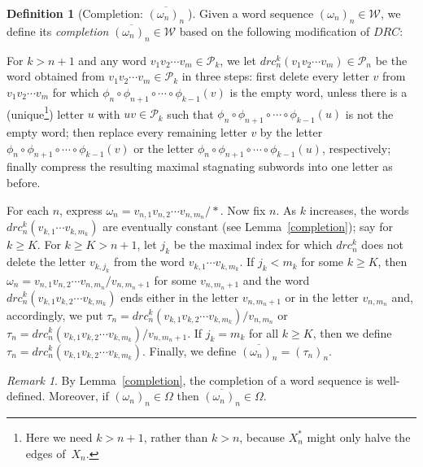 \documentclass{amsart}
\theoremstyle{definition}
\newtheorem{definition}[theorem]{Definition}
\theoremstyle{remark}
\newtheorem{remark}[theorem]{Remark}
\numberwithin{equation}{section}
\begin{document}
\begin{definition}[Completion: $\overline{(\omega_n)_n}\;$] \label{CompletionDef} Given a word sequence $(\omega_n)_n\in {\mathcal W}$, we define its {\em completion} $\overline{(\omega_n)_n}\in {\mathcal W}$ based on the following modification of  $DRC$:

For $k>n+1$ and any word $v_1v_2\cdots v_m\in {\mathcal P}_k$, we let
$drc^k_n(v_1v_2\cdots v_m)\in {\mathcal P}_n$ be the word obtained from $v_1v_2\cdots v_m\in {\mathcal P}_k$ in three steps: first delete every letter $v$ from $v_1v_2\cdots v_m$ for which  $\phi_n\circ \phi_{n+1}\circ\cdots\circ \phi_{k-1}(v)$ is the empty word, unless there is a (unique\footnote{Here we need $k>n+1$, rather than $k>n$, because $X^\ast_n$ might only halve the edges of~$X_n$.}) letter $u$ with $uv\in {\mathcal P}_k$ such that $\phi_n\circ \phi_{n+1}\circ\cdots\circ \phi_{k-1}(u)$ is not the empty word; then replace every remaining
letter $v$ by the letter
$\phi_n\circ \phi_{n+1}\circ\cdots\circ \phi_{k-1}(v)$ or the  letter $\phi_n\circ \phi_{n+1}\circ\cdots\circ \phi_{k-1}(u)$, respectively; finally compress the resulting maximal stagnating subwords into one letter as before.

For each $n$, express $\omega_n=v_{n,1}v_{n,2}\cdots v_{n,{m_n}}/\ast$. Now fix $n$. As $k$ increases, the words  $drc^k_n(v_{k,1}\cdots v_{k,{m_k}})$ are eventually constant (see Lemma~\ref{completion}); say for $k\geqslant K$. For $k\geqslant K>n+1$, let $j_k$ be the maximal index for which $drc_n^k$ does not delete the letter $v_{k,j_k}$ from the word $v_{k,1}\cdots v_{k,{m_k}}$. If  $j_k<m_k$ for some $k\geqslant K$, then
 $\omega_n=v_{n,1}v_{n,2}\cdots v_{n,{m_n}}/v_{n,{m_n+1}}$ for some $v_{n,{m_n+1}}$ and the word   $drc^k_n(v_{k,1}v_{k,2}\cdots v_{k,{m_k}})$  ends either in the letter  $v_{n,{m_n+1}}$ or in the letter $v_{n,{m_n}}$ and, accordingly, we
   put $\tau_n=drc^k_n(v_{k,1}v_{k,2}\cdots v_{k,{m_k}})/v_{n,{m_n}}$ or $\tau_n=drc^k_n(v_{k,1}v_{k,2}\cdots v_{k,{m_k}})/v_{n,{m_n+1}}$. If  $j_k=m_k$ for all $k\geqslant K$, then we  define $\tau_n=drc^k_n(v_{k,1}v_{k,2}\cdots v_{k,{m_k}})$.
    Finally, we define $\overline{(\omega_n)_n}=(\tau_n)_n$.
\end{definition}

\begin{remark} By Lemma~\ref{completion}, the completion of a word sequence
  is well-defined.  Moreover, if $(\omega_n)_n\in \Omega$ then $\overline{(\omega_n)_n}\in\Omega$.
\end{remark}
\end{document}
